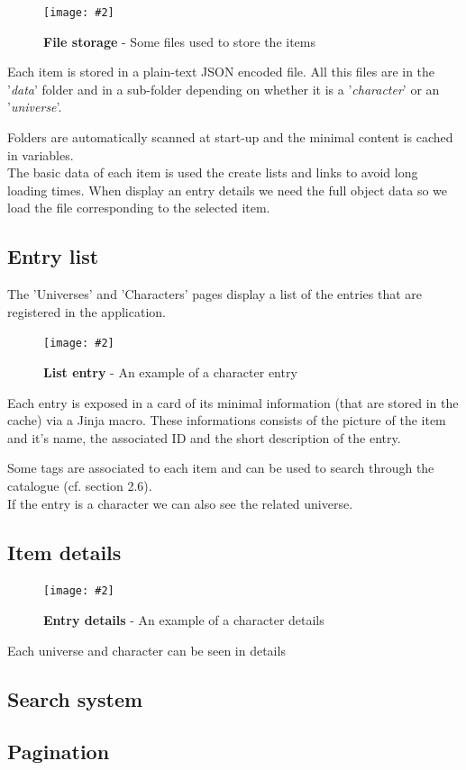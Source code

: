 \documentclass[10pt, a4paper]{article}
\newcommand{\figuremacro}[5]{
    \begin{figure}[#1]
        \centering
        \texttt{[image: \#2]}
        \caption[#3]{\textbf{#3}#4}
        \label{fig:#2}
    \end{figure}
}
\begin{document}
	\figuremacro{h}{JsonFiles}{File storage}{ - Some files used to store the items}{0.15}
	
	Each item is stored in a plain-text JSON encoded file. All this files are in the '\textit{data}' folder and in a sub-folder depending on whether it is a '\textit{character}' or an '\textit{universe}'.
	
	Folders are automatically scanned at start-up and the minimal content is cached in variables. \\
	The basic data of each item is used the create lists and links to avoid long loading times.
	When display an entry details we need the full object data so we load the file corresponding to the selected item.
	
	\subsection{Entry list}
	The 'Universes' and 'Characters' pages display a list of the entries that are registered in the application.
	
	\figuremacro{h}{CharacterEntry}{List entry}{ - An example of a character entry}{0.8}
	
	Each entry is exposed in a card of its minimal information (that are stored in the cache) via a Jinja macro. These informations consists of the picture of the item and it's name, the associated ID and the short description of the entry.
	
	Some tags are associated to each item and can be used to search through the catalogue (cf. section 2.6). \\
	If the entry is a character we can also see the related universe.
	
	\subsection{Item details}
	
	\figuremacro{h}{CharacterDetails}{Entry details}{ - An example of a character details}{0.6}
	
	Each universe and character can be seen in details 
	
	\subsection{Search system}
	
	\subsection{Pagination}
	
\end{document}
